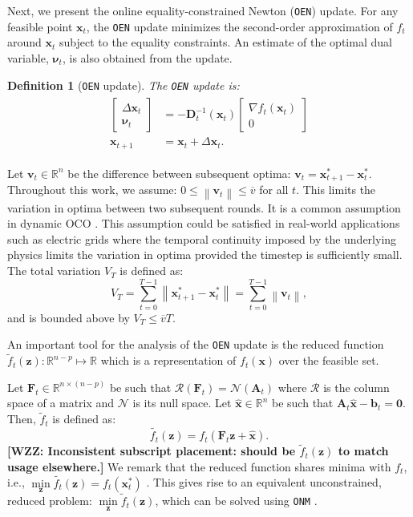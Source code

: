 \documentclass[journal,twoside,web]{ieeecolor}
\newtheorem{definition}[theorem]{Definition}
\newcommand{\norm}[1]{\left\lVert#1\right\rVert}
\newcommand{\xx}{\mathbf{x}}
\newcommand{\bb}{\mathbf{b}}
\newcommand{\zz}{\mathbf{z}}
\renewcommand{\AA}{\mathbf{A}}
\newcommand{\FF}{\mathbf{F}}
\newcommand{\vv}{\bm{\nu}}
\newcommand{\vt}{\mathbf{v}_t}
\newcommand{\DD}{\mathbf{D}}
\newcommand{\xh}{\mathbf{\hat{x}}}
\newcommand{\WZZtypo}[1]{{\color{blue}\bf{[WZZ: #1]}}}
\begin{document}
Next, we present the online equality-constrained Newton (\texttt{OEN}) update. For any feasible point $\xx_t$, the \texttt{OEN} update minimizes the second-order approximation of $f_t$ around $\xx_t$ subject to the equality constraints. An estimate of the optimal dual variable, $\vv_t$, is also obtained from the update.

\begin{definition}[\texttt{OEN} update]\label{nstepdef}
    The \texttt{OEN} update is:
\begin{align}
\begin{split}
    \begin{bmatrix}\Delta\xx_t\\ \vv_t\end{bmatrix} &= -\DD_t^{-1}(\xx_t)\begin{bmatrix}\nabla f_t(\xx_t)\\0\end{bmatrix}\\
    \xx_{t+1} &= \xx_t+\Delta\xx_t.
    \end{split}
\end{align}
\end{definition}

Let $\vt\in\mathbb{R}^n$ be the difference between subsequent optima:
$\vt =\xx_{t+1}^*-\xx_t^*$.
Throughout this work, we assume:
$0\le\norm{\vt}\le \overline{v}$ for all $t$. {This limits the variation in optima between two subsequent rounds. It is a common assumption in dynamic OCO \cite{MOSP, OnlineNewton, DynamicPolyak}. This assumption could be satisfied in real-world applications such as electric grids where the temporal continuity imposed by the underlying physics limits the variation in optima provided the timestep is sufficiently small.}
The total variation $V_T$ is defined as:
\[V_T = \sum\limits_{t=0}^{T-1} \norm{\xx_{t+1}^*-\xx_t^*}=\sum\limits_{t=0}^{T-1}\norm{\vt},\]
and is bounded above by $V_T\le \overline{v}T$.

An important tool for the analysis of the \texttt{OEN} update is the reduced function $\tilde{f}_t(\zz): \mathbb{R}^{n-p}\mapsto \mathbb{R}$ which is a representation of $f_t(\xx)$ over the feasible set. 

Let $\FF_t \in\mathbb{R}^{n\times(n-p)}$ be such that $\mathcal{R}(\FF_t) = \mathcal{N}(\AA_t)$ where $\mathcal{R}$ is the column space of a matrix and $\mathcal{N}$ is its null space.
Let $\xh\in\mathbb{R}^n$ be such that $\AA_t\xh-\bb_t=\mathbf{0}$. Then, $\tilde{f}_t$ is defined as:
\[\tilde{f_t}(\zz) = f_t(\FF_t \zz + \xh).\] \WZZtypo{Inconsistent subscript placement: should be $\tilde{f}_t(\zz)$ to match usage elsewhere.}
We remark that the reduced function shares minima with $f_t$, i.e., $\min\limits_{\zz} \tilde{f_t}(\zz) = f_t(\xx_t^*)$ \cite{boyd}. This gives rise to an equivalent unconstrained, reduced problem:
$\min\limits_{\zz} \tilde{f}_t(\zz)$, which can be solved using \texttt{ONM} \cite{OnlineNewton}.
\end{document}
